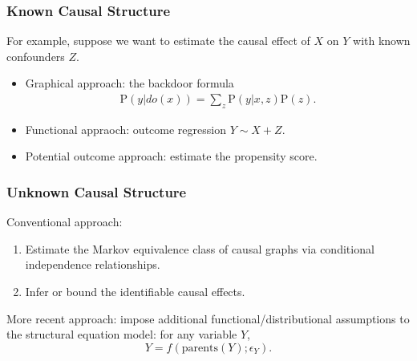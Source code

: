\documentclass{beamer}
\begin{document}
\begin{frame}
  \sectionpage
\end{frame}

\begin{frame}
  \frametitle{Known Causal Structure}
  \begin{center}
  \end{center}
  For example, suppose we want to estimate the causal effect of $X$ on $Y$ with
  known confounders $Z$.
  \begin{itemize}
  \item Graphical approach: the backdoor formula
    \vspace{-0.5em}
    \[
    \begin{split}
      \mathrm{P}(y|do(x)) = \sum_z \mathrm{P}(y|x, z) \mathrm{P}(z).
    \end{split}
    \]
    \vspace{-2em}
  \item Functional appraoch: outcome regression $Y \sim X + Z$.
  \item Potential outcome approach: estimate the propensity score.
  \end{itemize}
\end{frame}

\begin{frame}

  \frametitle{Unknown Causal Structure}
  Conventional approach:
  \begin{enumerate}
  \item Estimate the Markov equivalence class of causal graphs via conditional
    independence relationships.
  \item Infer or bound the identifiable causal effects.
  \end{enumerate}

  \vspace{1em}

  More recent approach: impose additional functional/distributional
  assumptions to the structural equation model: for any variable $Y$,
  \[
  Y = f(\mathrm{parents}(Y);\epsilon_Y).
  \]

\end{frame}
\end{document}

